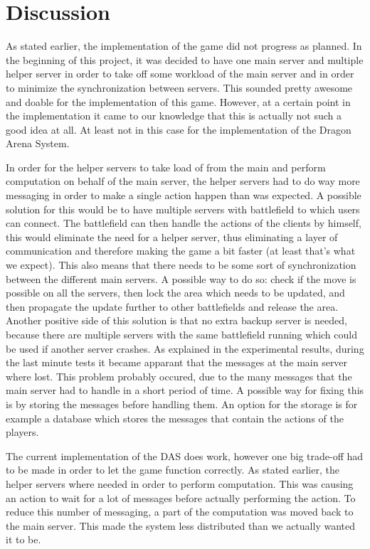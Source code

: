 \section{Discussion}
As stated earlier, the implementation of the game did not progress as planned.
In the beginning of this project, it was decided to have one main server and multiple helper server in order to take off some workload of the main server and in order to minimize the synchronization between servers.
This sounded pretty awesome and doable for the implementation of this game.
However, at a certain point in the implementation it came to our knowledge that this is actually not such a good idea at all.
At least not in this case for the implementation of the Dragon Arena System.

In order for the helper servers to take load of from the main and perform computation on behalf of the main server, the helper servers had to do way more messaging in order to make a single action happen than was expected.
A possible solution for this would be to have multiple servers with battlefield to which users can connect.
The battlefield can then handle the actions of the clients by himself, this would eliminate the need for a helper server, thus eliminating a layer of communication and therefore making the game a bit faster (at least that's what we expect). 
This also means that there needs to be some sort of synchronization between the different main servers.
A possible way to do so: check if the move is possible on all the servers, then lock the area which needs to be updated, and then propagate the update further to other battlefields and release the area.
Another positive side of this solution is that no extra backup server is needed, because there are multiple servers with the same battlefield running which could be used if another server crashes.
As explained in the experimental results, during the last minute tests it became apparant that the messages at the main server where lost. 
This problem probably occured, due to the many messages that the main server had to handle in a short period of time. A possible way for fixing this is by storing the messages before handling them. An option for the storage is for example a database which stores the messages that contain the actions of the players.

The current implementation of the DAS does work, however one big trade-off had to be made in order to let the game function correctly.
As stated earlier, the helper servers where needed in order to perform computation. 
This was causing an action to wait for a lot of messages before actually performing the action.
To reduce this number of messaging, a part of the computation was moved back to the main server.
This made the system less distributed than we actually wanted it to be.

